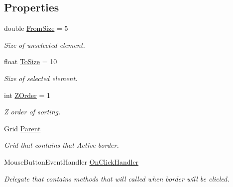 \subsection*{Properties}
\begin{DoxyCompactItemize}
\item 
double \mbox{\hyperlink{class_wpf_handler_1_1_u_i_1_1_controls_1_1_selectable_grid_1_1_active_border_a0f21d67ca14446e3737e6a5ec6ccf28e}{From\+Size}} = 5
\begin{DoxyCompactList}\small\item\em Size of unselected element. \end{DoxyCompactList}\item 
float \mbox{\hyperlink{class_wpf_handler_1_1_u_i_1_1_controls_1_1_selectable_grid_1_1_active_border_aafea7a53bf2f1e3941c6401ab8015ccc}{To\+Size}} = 10
\begin{DoxyCompactList}\small\item\em Size of selected element. \end{DoxyCompactList}\item 
int \mbox{\hyperlink{class_wpf_handler_1_1_u_i_1_1_controls_1_1_selectable_grid_1_1_active_border_a272aa3ae0e1ed22cc71750027dccc3ed}{Z\+Order}} = 1
\begin{DoxyCompactList}\small\item\em Z order of sorting. \end{DoxyCompactList}\item 
Grid \mbox{\hyperlink{class_wpf_handler_1_1_u_i_1_1_controls_1_1_selectable_grid_1_1_active_border_a11afe32c9093d44978e8194bb24e3cfd}{Parent}}
\begin{DoxyCompactList}\small\item\em Grid that contain\textquotesingle{}s that Active border. \end{DoxyCompactList}\item 
Mouse\+Button\+Event\+Handler \mbox{\hyperlink{class_wpf_handler_1_1_u_i_1_1_controls_1_1_selectable_grid_1_1_active_border_a2013d5123bcb022dddcb6654d50434ce}{On\+Click\+Handler}}
\begin{DoxyCompactList}\small\item\em Delegate that contains methods that will called when border will be clicled. \end{DoxyCompactList}\item 

\end{DoxyCompactItemize}
